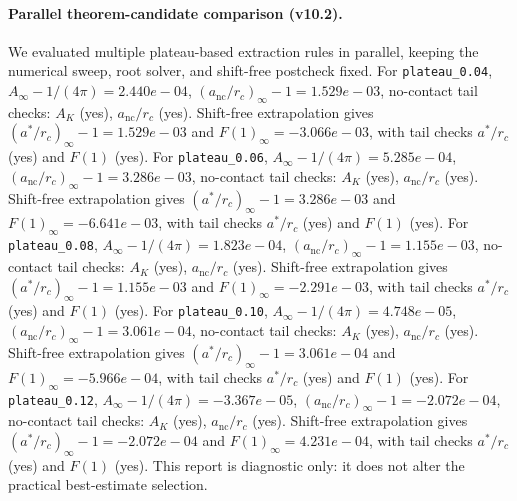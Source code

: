 \paragraph{Parallel theorem-candidate comparison (v10.2).}
We evaluated multiple plateau-based extraction rules in parallel, keeping the numerical sweep, root solver, and shift-free postcheck fixed. For \texttt{plateau_0.04}, $A_\infty-1/(4\pi)=2.440e-04$, $(a_{\mathrm{nc}}/r_c)_\infty-1=1.529e-03$, no-contact tail checks: $A_K$ (yes), $a_{\mathrm{nc}}/r_c$ (yes). Shift-free extrapolation gives $(a^*/r_c)_\infty-1=1.529e-03$ and $F(1)_\infty=-3.066e-03$, with tail checks $a^*/r_c$ (yes) and $F(1)$ (yes). For \texttt{plateau_0.06}, $A_\infty-1/(4\pi)=5.285e-04$, $(a_{\mathrm{nc}}/r_c)_\infty-1=3.286e-03$, no-contact tail checks: $A_K$ (yes), $a_{\mathrm{nc}}/r_c$ (yes). Shift-free extrapolation gives $(a^*/r_c)_\infty-1=3.286e-03$ and $F(1)_\infty=-6.641e-03$, with tail checks $a^*/r_c$ (yes) and $F(1)$ (yes). For \texttt{plateau_0.08}, $A_\infty-1/(4\pi)=1.823e-04$, $(a_{\mathrm{nc}}/r_c)_\infty-1=1.155e-03$, no-contact tail checks: $A_K$ (yes), $a_{\mathrm{nc}}/r_c$ (yes). Shift-free extrapolation gives $(a^*/r_c)_\infty-1=1.155e-03$ and $F(1)_\infty=-2.291e-03$, with tail checks $a^*/r_c$ (yes) and $F(1)$ (yes). For \texttt{plateau_0.10}, $A_\infty-1/(4\pi)=4.748e-05$, $(a_{\mathrm{nc}}/r_c)_\infty-1=3.061e-04$, no-contact tail checks: $A_K$ (yes), $a_{\mathrm{nc}}/r_c$ (yes). Shift-free extrapolation gives $(a^*/r_c)_\infty-1=3.061e-04$ and $F(1)_\infty=-5.966e-04$, with tail checks $a^*/r_c$ (yes) and $F(1)$ (yes). For \texttt{plateau_0.12}, $A_\infty-1/(4\pi)=-3.367e-05$, $(a_{\mathrm{nc}}/r_c)_\infty-1=-2.072e-04$, no-contact tail checks: $A_K$ (yes), $a_{\mathrm{nc}}/r_c$ (yes). Shift-free extrapolation gives $(a^*/r_c)_\infty-1=-2.072e-04$ and $F(1)_\infty=4.231e-04$, with tail checks $a^*/r_c$ (yes) and $F(1)$ (yes). This report is diagnostic only: it does not alter the practical best-estimate selection.
